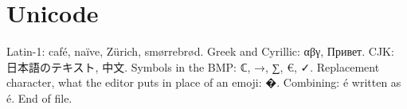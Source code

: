 \section{Unicode}
Latin-1: café, naïve, Zürich, smørrebrød.
Greek and Cyrillic: αβγ, Привет.
CJK: 日本語のテキスト, 中文.
Symbols in the BMP: ℂ, →, ∑, €, ✓.
Replacement character, what the editor puts in place of an emoji: �.
Combining: é written as é.
End of file.
